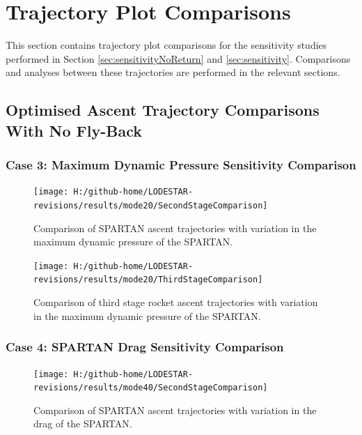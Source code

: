 		
		\chapter{Trajectory Plot Comparisons}\label{sec:Appendix_trajectorycomparisons}
		
		
This section contains trajectory plot comparisons for the sensitivity studies performed in Section \ref{sec:sensitivityNoReturn} and \ref{sec:sensitivity}. Comparisons and analyses between these trajectories are performed in the relevant sections. 
		\clearpage
		\section{Optimised Ascent Trajectory Comparisons With No Fly-Back}
		
		\subsection{Case 3: Maximum Dynamic Pressure Sensitivity Comparison}\label{sec:app_comparison20}
		
		
\begin{figure}[!ht]
\centering
\texttt{[image: H:/github-home/LODESTAR-revisions/results/mode20/SecondStageComparison]}
\caption{Comparison of SPARTAN ascent trajectories with variation in the maximum dynamic pressure of the SPARTAN.}
\label{fig:SecondStageComparison1}
\end{figure}

\begin{figure}[!th]
\centering
\texttt{[image: H:/github-home/LODESTAR-revisions/results/mode20/ThirdStageComparison]}
\caption{Comparison of third stage rocket ascent trajectories with variation in the maximum dynamic pressure of the SPARTAN.}
\label{fig:ThirdStageComparison1}
\end{figure}
\FloatBarrier

\clearpage

\subsection{Case 4: SPARTAN Drag Sensitivity Comparison}\label{sec:app_comparison40}

\begin{figure}[!th]
\centering
\texttt{[image: H:/github-home/LODESTAR-revisions/results/mode40/SecondStageComparison]}
\caption{Comparison of SPARTAN ascent trajectories with variation in the drag of the SPARTAN.}
\label{fig:SecondStageComparison3}
\end{figure}


